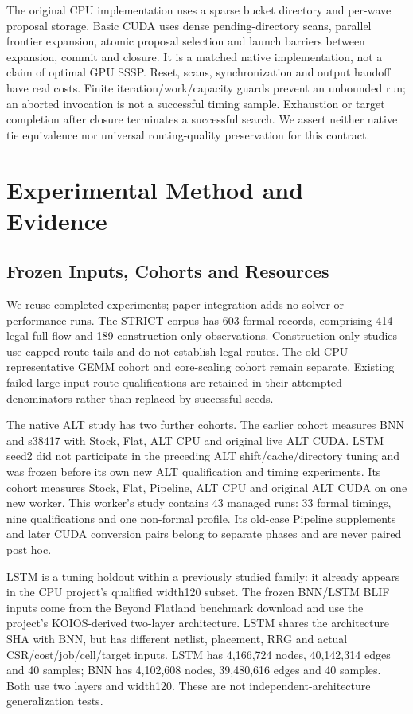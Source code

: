 \documentclass[conference,10pt,letterpaper]{IEEEtran}
\begin{document}
The original CPU implementation uses a sparse bucket directory and per-wave proposal storage. Basic CUDA uses dense pending-directory scans, parallel frontier expansion, atomic proposal selection and launch barriers between expansion, commit and closure. It is a matched native implementation, not a claim of optimal GPU SSSP. Reset, scans, synchronization and output handoff have real costs. Finite iteration/work/capacity guards prevent an unbounded run; an aborted invocation is not a successful timing sample. Exhaustion or target completion after closure terminates a successful search. We assert neither native tie equivalence nor universal routing-quality preservation for this contract.

\section{Experimental Method and Evidence}
\subsection{Frozen Inputs, Cohorts and Resources}
We reuse completed experiments; paper integration adds no solver or performance runs. The STRICT corpus has 603 formal records, comprising 414 legal full-flow and 189 construction-only observations. Construction-only studies use capped route tails and do not establish legal routes. The old CPU representative GEMM cohort and core-scaling cohort remain separate. Existing failed large-input route qualifications are retained in their attempted denominators rather than replaced by successful seeds.

The native ALT study has two further cohorts. The earlier cohort measures BNN and s38417 with Stock, Flat, ALT CPU and original live ALT CUDA. LSTM seed2 did not participate in the preceding ALT shift/cache/directory tuning and was frozen before its own new ALT qualification and timing experiments. Its cohort measures Stock, Flat, Pipeline, ALT CPU and original ALT CUDA on one new worker. This worker's study contains 43 managed runs: 33 formal timings, nine qualifications and one non-formal profile. Its old-case Pipeline supplements and later CUDA conversion pairs belong to separate phases and are never paired post hoc.

LSTM is a tuning holdout within a previously studied family: it already appears in the CPU project's qualified width120 subset. The frozen BNN/LSTM BLIF inputs come from the Beyond Flatland benchmark download and use the project's KOIOS-derived two-layer architecture. LSTM shares the architecture SHA with BNN, but has different netlist, placement, RRG and actual CSR/cost/job/cell/target inputs. LSTM has 4,166,724 nodes, 40,142,314 edges and 40 samples; BNN has 4,102,608 nodes, 39,480,616 edges and 40 samples. Both use two layers and width120. These are not independent-architecture generalization tests.
\end{document}

